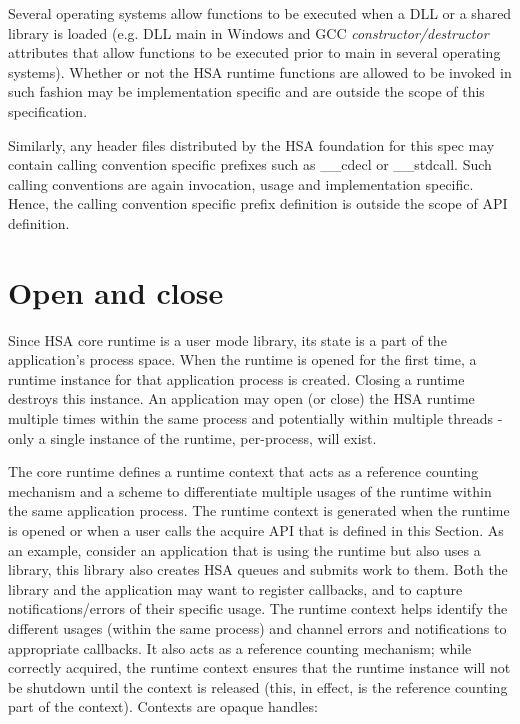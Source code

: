 \documentclass[draft]{book}
\begin{document}
Several operating systems allow functions to be executed when a DLL or a shared
library is loaded (e.g. DLL main in Windows and GCC
\emph{constructor/destructor} attributes that allow functions to be executed
prior to main in several operating systems). Whether or not the HSA runtime
functions are allowed to be invoked in such fashion may be implementation
specific and are outside the scope of this specification.

Similarly, any header files distributed by the HSA foundation for this spec may
contain calling convention specific prefixes such as __cdecl or
__stdcall. Such calling conventions are again invocation, usage and
implementation specific. Hence, the calling convention specific prefix
definition is outside the scope of API definition.

\hypertarget{init}{}\section{Open and close}\label{init}

Since HSA core runtime is a user mode library, its state is a part of the
application's process space. When the runtime is opened for the first time, a
runtime instance for that application process is created. Closing a runtime
destroys this instance. An application may open (or close) the HSA runtime
multiple times within the same process and potentially within multiple threads
- only a single instance of the runtime, per-process, will exist.

The core runtime defines a runtime context that acts as a reference counting
mechanism and a scheme to differentiate multiple usages of the runtime within
the same application process. The runtime context is generated when the runtime
is opened or when a user calls the acquire API that is defined in this
Section. As an example, consider an application that is using the runtime but
also uses a library, this library also creates HSA queues and submits work to
them. Both the library and the application may want to register callbacks, and
to capture notifications/errors of their specific usage. The runtime context
helps identify the different usages (within the same process) and channel errors
and notifications to appropriate callbacks. It also acts as a reference counting
mechanism; while correctly acquired, the runtime context ensures that
the runtime instance will not be shutdown until the context is released
(this, in effect, is the reference counting part of the context). Contexts are
opaque handles:
\end{document}
